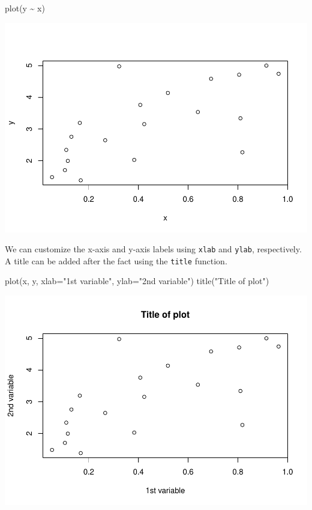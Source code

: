 \documentclass[
]{article}
\newenvironment{Shaded}{\begin{snugshade}}{\end{snugshade}}
\newcommand{\AttributeTok}[1]{\textcolor[rgb]{0.77,0.63,0.00}{#1}}
\newcommand{\FunctionTok}[1]{\textcolor[rgb]{0.00,0.00,0.00}{#1}}
\newcommand{\NormalTok}[1]{#1}
\newcommand{\SpecialCharTok}[1]{\textcolor[rgb]{0.00,0.00,0.00}{#1}}
\newcommand{\StringTok}[1]{\textcolor[rgb]{0.31,0.60,0.02}{#1}}
\begin{document}
\begin{Shaded}
\begin{Highlighting}[]
\FunctionTok{plot}\NormalTok{(y }\SpecialCharTok{\textasciitilde{}}\NormalTok{ x)}
\end{Highlighting}
\end{Shaded}

\includegraphics{crash-course-in-r_files/figure-latex/unnamed-chunk-20-2.pdf}

We can customize the x-axis and y-axis labels using \texttt{xlab} and
\texttt{ylab}, respectively. A title can be added after the fact using
the \texttt{title} function.

\begin{Shaded}
\begin{Highlighting}[]
\FunctionTok{plot}\NormalTok{(x, y, }\AttributeTok{xlab=}\StringTok{"1st variable"}\NormalTok{, }\AttributeTok{ylab=}\StringTok{"2nd variable"}\NormalTok{)}
\FunctionTok{title}\NormalTok{(}\StringTok{"Title of plot"}\NormalTok{)}
\end{Highlighting}
\end{Shaded}

\includegraphics{crash-course-in-r_files/figure-latex/unnamed-chunk-21-1.pdf}
\end{document}
